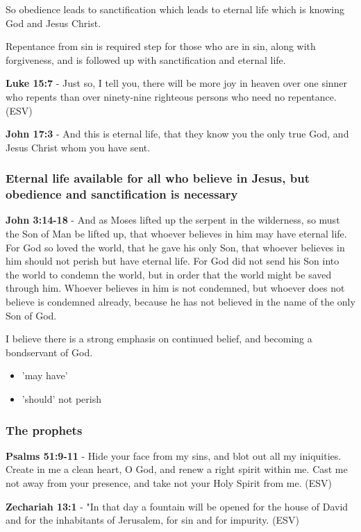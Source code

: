 \documentclass[11pt]{article}
\begin{document}
So obedience leads to sanctification which leads to eternal life which is knowing God and Jesus Christ.

Repentance from sin is required step for those who are in sin, along with forgiveness, and is followed up with sanctification and eternal life.

\textbf{Luke 15:7} - Just so, I tell you, there will be more joy in heaven over one sinner who repents than over ninety-nine righteous persons who need no repentance.  (ESV)

\textbf{John 17:3} - And this is eternal life, that they know you the only true God, and Jesus Christ whom you have sent.

\subsubsection{Eternal life \textbf{available} for all who believe in Jesus, but obedience and sanctification is necessary}
\label{sec:orga642aa0}
\textbf{John 3:14-18} - And as Moses lifted up the serpent in the wilderness, so must the Son of Man be lifted up, that whoever believes in him may have eternal life.  For God so loved the world, that he gave his only Son, that whoever believes in him should not perish but have eternal life.  For God did not send his Son into the world to condemn the world, but in order that the world might be saved through him.  Whoever believes in him is not condemned, but whoever does not believe is condemned already, because he has not believed in the name of the only Son of God.

I believe there is a strong emphasis on continued belief, and becoming a bondservant of God.
\begin{itemize}
\item 'may have'
\item 'should' not perish
\end{itemize}

\subsubsection{The prophets}
\label{sec:orge43e0bc}
\textbf{Psalms 51:9-11} - Hide your face from my sins, and blot out all my iniquities. Create in me a clean heart, O God, and renew a right spirit within me. Cast me not away from your presence, and take not your Holy Spirit from me. (ESV)

\textbf{Zechariah 13:1} - "In that day a fountain will be opened for the house of David and for the inhabitants of Jerusalem, for sin and for impurity. (ESV)
\end{document}
